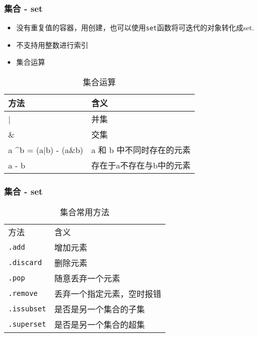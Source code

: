 \documentclass[10pt]{beamer}
\begin{document}
\begin{frame}

    \frametitle{集合 - set}

    \begin{itemize}
        \item 没有重复值的容器，用\texttt{{}}创建，也可以使用\texttt{set}函数将可迭代的对象转化成set.
        \item 不支持用整数进行索引
        \item 集合运算
    \end{itemize}

    \begin{table}
        \caption{集合运算}
        \begin{tabular}{ll}
            \toprule
            方法 & 含义 \\
            \midrule
            | & 并集 \\
            \& & 交集 \\
            a \textasciicircum b = (a|b) - (a\&b) & a 和 b 中不同时存在的元素 \\ 
            a - b & 存在于a不存在与b中的元素
        \end{tabular}
    \end{table}

\end{frame}


\begin{frame}
    \frametitle{集合 - set}

    \begin{table}
    \caption{集合常用方法}
    \begin{tabular}{ll} \toprule
    方法 & 含义 \\
    \texttt{.add} & 增加元素 \\
    \texttt{.discard} & 删除元素 \\
    \texttt{.pop} & 随意丢弃一个元素 \\
    \texttt{.remove} & 丢弃一个指定元素，空时报错 \\
    \texttt{.issubset} & 是否是另一个集合的子集 \\
    \texttt{.superset} & 是否是另一个集合的超集 \\ \bottomrule
    \end{tabular}
    \end{table}

\end{frame}
\end{document}
